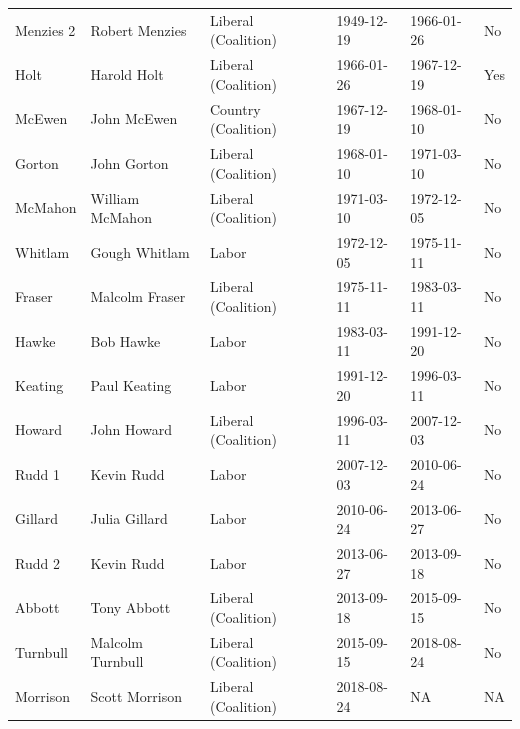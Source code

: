 \documentclass[12pt,]{article}
\theoremstyle{definition}
\theoremstyle{definition}
\theoremstyle{definition}
\theoremstyle{remark}
\begin{document}
\begin{table}
\begin{tabular}[t]{llllll}
\addlinespace
Menzies 2 & Robert Menzies & Liberal (Coalition) & 1949-12-19 & 1966-01-26 & No\\
Holt & Harold Holt & Liberal (Coalition) & 1966-01-26 & 1967-12-19 & Yes\\
McEwen & John McEwen & Country (Coalition) & 1967-12-19 & 1968-01-10 & No\\
Gorton & John Gorton & Liberal (Coalition) & 1968-01-10 & 1971-03-10 & No\\
McMahon & William McMahon & Liberal (Coalition) & 1971-03-10 & 1972-12-05 & No\\
\addlinespace
Whitlam & Gough Whitlam & Labor & 1972-12-05 & 1975-11-11 & No\\
Fraser & Malcolm Fraser & Liberal (Coalition) & 1975-11-11 & 1983-03-11 & No\\
Hawke & Bob Hawke & Labor & 1983-03-11 & 1991-12-20 & No\\
Keating & Paul Keating & Labor & 1991-12-20 & 1996-03-11 & No\\
Howard & John Howard & Liberal (Coalition) & 1996-03-11 & 2007-12-03 & No\\
\addlinespace
Rudd 1 & Kevin Rudd & Labor & 2007-12-03 & 2010-06-24 & No\\
Gillard & Julia Gillard & Labor & 2010-06-24 & 2013-06-27 & No\\
Rudd 2 & Kevin Rudd & Labor & 2013-06-27 & 2013-09-18 & No\\
Abbott & Tony Abbott & Liberal (Coalition) & 2013-09-18 & 2015-09-15 & No\\
Turnbull & Malcolm Turnbull & Liberal (Coalition) & 2015-09-15 & 2018-08-24 & No\\
Morrison & Scott Morrison & Liberal (Coalition) & 2018-08-24 & NA & NA\\
\bottomrule
\end{tabular}
\end{table}
\end{document}
